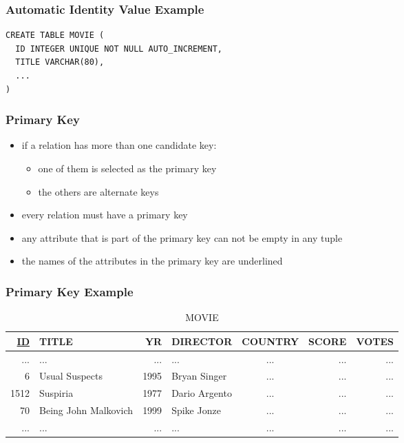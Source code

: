 \documentclass[dvipsnames]{beamer}
\theoremstyle{plain}
\begin{document}
\begin{frame}[fragile]
  \frametitle{Automatic Identity Value Example}

  \begin{example}[MySQL]
    \begin{lstlisting}
CREATE TABLE MOVIE (
  ID INTEGER UNIQUE NOT NULL AUTO_INCREMENT,
  TITLE VARCHAR(80),
  ...
)
    \end{lstlisting}
  \end{example}
\end{frame}

\begin{frame}
  \frametitle{Primary Key}

  \begin{itemize}
    \item if a relation has more than one candidate key:
    \begin{itemize}
      \item one of them is selected as the \alert{primary key}
      \item the others are \alert{alternate keys}
    \end{itemize}

    \pause
    \item every relation must have a primary key

    \pause
    \item any attribute that is part of the primary key can not be empty
      in any tuple

    \pause
    \item the names of the attributes in the primary key are underlined
  \end{itemize}
\end{frame}

\begin{frame}
  \frametitle{Primary Key Example}

  \begin{example}
    \begin{tiny}
    \begin{table}
      \caption{MOVIE}
      \begin{tabular}{|r|l|r|l|c|r|r|}\hline
\underline{ID} & TITLE      &   YR & DIRECTOR      & COUNTRY & SCORE & VOTES\\\hline\hline
 ... & ...                  &  ... & ...           & ...     &   ... &   ...\\\hline
   6 & Usual Suspects       & 1995 & Bryan Singer  & ...     &   ... &   ...\\\hline
1512 & Suspiria             & 1977 & Dario Argento & ...     &   ... &   ...\\\hline
  70 & Being John Malkovich & 1999 & Spike Jonze   & ...     &   ... &   ...\\\hline
 ... & ...                  &  ... & ...           & ...     &   ... &   ...\\\hline
      \end{tabular}
    \end{table}
    \end{tiny}
  \end{example}
\end{frame}
\end{document}
